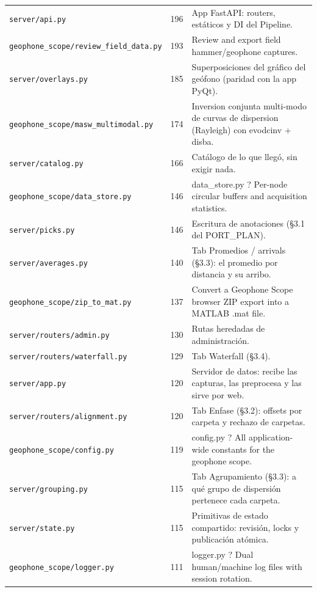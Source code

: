 \begin{longtable}{@{}p{5.4cm} r p{8.6cm}@{}}
\texttt{\scriptsize server/api.py} & 196 & App FastAPI: routers, estáticos y DI del Pipeline. \\
\texttt{\scriptsize geophone\_scope/review\_field\_data.py} & 193 & Review and export field hammer/geophone captures. \\
\texttt{\scriptsize server/overlays.py} & 185 & Superposiciones del gráfico del geófono (paridad con la app PyQt). \\
\texttt{\scriptsize geophone\_scope/masw\_multimodal.py} & 174 & Inversion conjunta multi-modo de curvas de dispersion (Rayleigh) con evodcinv + disba. \\
\texttt{\scriptsize server/catalog.py} & 166 & Catálogo de lo que llegó, sin exigir nada. \\
\texttt{\scriptsize geophone\_scope/data\_store.py} & 146 & data\_store.py ? Per-node circular buffers and acquisition statistics. \\
\texttt{\scriptsize server/picks.py} & 146 & Escritura de anotaciones (§3.1 del PORT\_PLAN). \\
\texttt{\scriptsize server/averages.py} & 140 & Tab Promedios / arrivals (§3.3): el promedio por distancia y su arribo. \\
\texttt{\scriptsize geophone\_scope/zip\_to\_mat.py} & 137 & Convert a Geophone Scope browser ZIP export into a MATLAB .mat file. \\
\texttt{\scriptsize server/routers/admin.py} & 130 & Rutas heredadas de administración. \\
\texttt{\scriptsize server/routers/waterfall.py} & 129 & Tab Waterfall (§3.4). \\
\texttt{\scriptsize server/app.py} & 120 & Servidor de datos: recibe las capturas, las preprocesa y las sirve por web. \\
\texttt{\scriptsize server/routers/alignment.py} & 120 & Tab Enfase (§3.2): offsets por carpeta y rechazo de carpetas. \\
\texttt{\scriptsize geophone\_scope/config.py} & 119 & config.py ? All application-wide constants for the geophone scope. \\
\texttt{\scriptsize server/grouping.py} & 115 & Tab Agrupamiento (§3.3): a qué grupo de dispersión pertenece cada carpeta. \\
\texttt{\scriptsize server/state.py} & 115 & Primitivas de estado compartido: revisión, locks y publicación atómica. \\
\texttt{\scriptsize geophone\_scope/logger.py} & 111 & logger.py ? Dual human/machine log files with session rotation. \\

\end{longtable}
